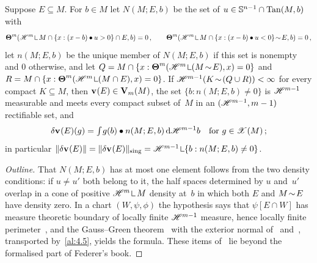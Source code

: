 \begin{theorem}
    \label{al:4.7}
    Suppose $E \subseteq M$. For $b \in M$ let $N(M;E,b)$ be the set of $u \in \mathbb{S}^{n-1}
    \cap \operatorname{Tan}(M,b)$ with
    \begin{displaymath}
        \density^m(\HM^m \restrict M \cap \{ x : (x-b) \bullet u > 0 \} \cap E, b) = 0 \,, \qquad
        \density^m(\HM^m \restrict M \cap \{ x : (x-b) \bullet u < 0 \} \without E, b) = 0 \,,
    \end{displaymath}
    let $n(M;E,b)$ be the unique member of $N(M;E,b)$ if this set is nonempty and $0$ otherwise,
    and let $Q = M \cap \{ x : \density^m(\HM^m \restrict (M \without E), x) = 0 \}$ and $R = M
    \cap \{ x : \density^m(\HM^m \restrict (M \cap E), x) = 0 \}$. If $\mathscr{H}^{m-1}(K \!\sim\! (Q
    \cup R)) < \infty$ for every compact $K \subseteq M$, then $\mathbf{v}_{}(E) \in \mathbf{V}_{m}(M)$, the set
    $\{ b : n(M;E,b) \ne 0 \}$ is $\mathscr{H}^{m-1}$ measurable and meets every compact subset of~$M$ in
    an $(\mathscr{H}^{m-1},m-1)$ rectifiable set, and
    \begin{displaymath}
        \delta \mathbf{v}_{}(E)(g) = {\textstyle\int_{}^{}} g(b) \bullet n(M;E,b) \,\mathrm{d} \mathscr{H}^{m-1} b \quad \text{for $g
        \in \mathscr{X}(M)$} \,;
    \end{displaymath}
    in particular $\|\delta \var{}(E)\| = \|\delta \var{}(E)\|_{\mathrm{sing}} = \HM^{m-1} \restrict
    \{ b : n(M;E,b) \ne 0 \}$.
\end{theorem}

\begin{proof}[Outline]
    That $N(M;E,b)$ has at most one element follows from the two density conditions: if $u \ne
    u'$ both belong to it, the half spaces determined by $u$ and~$u'$ overlap in a cone of
    positive $\HM^m \restrict M$ density at~$b$ in which both $E$ and $M \!\sim\! E$ have density
    zero. In a chart $(W,\psi,\phi)$ the hypothesis says that $\psi[E \cap W]$ has measure
    theoretic boundary of locally finite $\mathscr{H}^{m-1}$ measure, hence locally finite
    perimeter~\cite[4.5.11]{Federer1969}, and the Gauss--Green theorem~\cite[4.5.6]{Federer1969}
    with the exterior normal of~\cite[4.5.5]{Federer1969} and~\cite[4.5.12]{Federer1969}, transported
    by~\ref{al:4.5}, yields the formula. These items of~\cite[4.5]{Federer1969} lie beyond the
    formalised part of Federer's book.
\end{proof}


